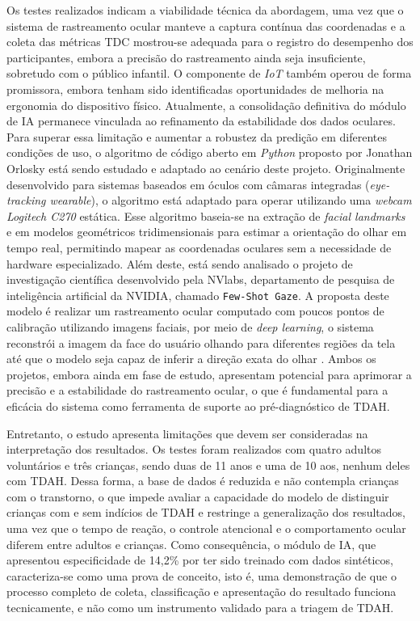 \documentclass[11pt,a4paper]{article}
\begin{document}
Os testes realizados indicam a viabilidade técnica da abordagem, uma vez que o sistema de rastreamento ocular manteve a captura contínua das coordenadas e a coleta das métricas TDC mostrou-se adequada para o registro do desempenho dos participantes, embora a precisão do rastreamento ainda seja insuficiente, sobretudo com o público infantil. O componente de \textit{IoT} também operou de forma promissora, embora tenham sido identificadas oportunidades de melhoria na ergonomia do dispositivo físico. Atualmente, a consolidação definitiva do módulo de IA permanece vinculada ao refinamento da estabilidade dos dados oculares. Para superar essa limitação e aumentar a robustez da predição em diferentes condições de uso, o algoritmo de código aberto em \textit{Python} \cite{orlosky2023eyetracker} proposto por Jonathan Orlosky está sendo estudado e adaptado ao cenário deste projeto. Originalmente desenvolvido para sistemas baseados em óculos com câmaras integradas (\textit{eye-tracking wearable}), o algoritmo está adaptado para operar utilizando uma \textit{webcam Logitech C270} estática. Esse algoritmo baseia-se na extração de \textit{facial landmarks} e em modelos geométricos tridimensionais para estimar a orientação do olhar em tempo real, permitindo mapear as coordenadas oculares sem a necessidade de hardware especializado. Além deste, está sendo analisado o projeto de investigação científica desenvolvido pela NVlabs, departamento de pesquisa de inteligência artificial da NVIDIA, chamado \texttt{Few-Shot Gaze}. A proposta deste modelo é realizar um rastreamento ocular computado com poucos pontos de calibração utilizando imagens faciais, por meio de \textit{deep learning}, o sistema reconstrói a imagem da face do usuário olhando para diferentes regiões da tela até que o modelo seja capaz de inferir a direção exata do olhar \cite{park2019faze}. Ambos os projetos, embora ainda em fase de estudo, apresentam potencial para aprimorar a precisão e a estabilidade do rastreamento ocular, o que é fundamental para a eficácia do sistema como ferramenta de suporte ao pré-diagnóstico de TDAH.

Entretanto, o estudo apresenta limitações que devem ser consideradas na interpretação dos resultados. Os testes foram realizados com quatro adultos voluntários e três crianças, sendo duas de 11 anos e uma de 10 aos, nenhum deles com TDAH. Dessa forma, a base de dados é reduzida e não contempla crianças com o transtorno, o que impede avaliar a capacidade do modelo de distinguir crianças com e sem indícios de TDAH e restringe a generalização dos resultados, uma vez que o tempo de reação, o controle atencional e o comportamento ocular diferem entre adultos e crianças. Como consequência, o módulo de IA, que apresentou especificidade de 14,2\% por ter sido treinado com dados sintéticos, caracteriza-se como uma prova de conceito, isto é, uma demonstração de que o processo completo de coleta, classificação e apresentação do resultado funciona tecnicamente, e não como um instrumento validado para a triagem de TDAH.
\end{document}
